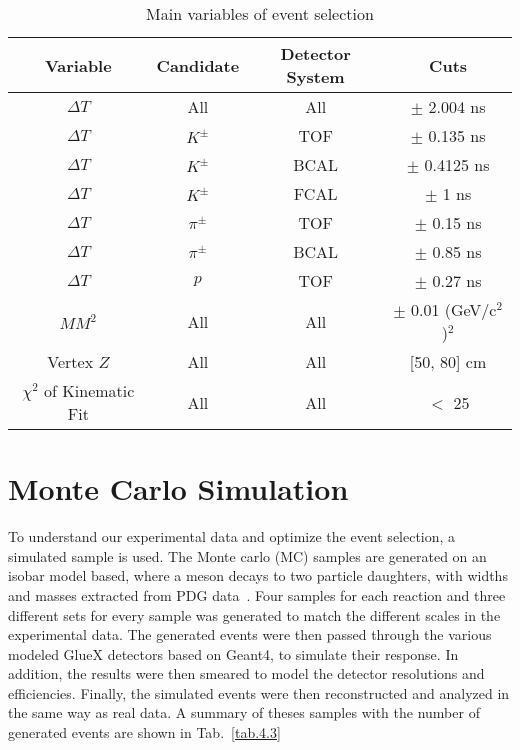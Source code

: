 \begin{table}[H]
    \centering
    \caption{Main variables of event selection}
    \label{tab.4.2}
    \begin{tabular}{|c|c|c|c|}
        \hline
        Variable & Candidate & Detector System & Cuts \\
        \hline
        $\Delta T$ & All & All & $\pm$ 2.004 ns \\
        \hline
        $\Delta T$ & $K^{\pm}$ & TOF & $\pm$ 0.135 ns \\
        \hline
        $\Delta T$ & $K^{\pm}$ & BCAL & $\pm$ 0.4125 ns \\
        \hline
        $\Delta T$ & $K^{\pm}$ & FCAL & $\pm$ 1 ns \\
        \hline
        $\Delta T$ & $\pi^{\pm}$ & TOF & $\pm$ 0.15 ns \\
        \hline
        $\Delta T$ & $\pi^{\pm}$ & BCAL & $\pm$ 0.85 ns \\
        \hline
        $\Delta T$ & $p$ & TOF & $\pm$ 0.27 ns \\
        \hline
        $MM^2$ & All & All & $\pm$ 0.01 (GeV/c$^2$ )$^2$ \\
        \hline
        Vertex $Z$ & All & All & [50, 80] cm\\
        \hline
        $\chi^2$ of Kinematic Fit & All & All & $<$ 25\\
        \hline
    \end{tabular}
\end{table}

\section{Monte Carlo Simulation}
\label{p.4.3}

To understand our experimental data and optimize the event selection, a simulated sample is used. The Monte carlo (MC) samples are generated on an isobar model based, where a meson decays to two particle daughters, with widths and masses extracted from PDG data~\cite{8}. Four samples for each reaction and three different sets for every sample was generated to match the different scales in the experimental data. The generated events were then passed through the various modeled GlueX detectors based on Geant4, to simulate their response. In addition, the results were then smeared to model the detector resolutions and efficiencies. Finally, the simulated events were then reconstructed and analyzed in the same way as real data. A summary of theses samples with the number of generated events are shown in Tab.~\ref{tab.4.3}   

